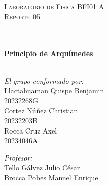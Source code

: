 \documentclass[10pt]{article}
\begin{document}
\begin{center}
\begin{minipage}{0.9\textwidth} 
\begin{center}																					%
\textsc{\LARGE  Laboratorio de Física BFI01 A\\[0.7cm] Reporte 05}
\end{center}
\end{minipage}\\[0.3cm]
 			\vspace*{0.4cm}																		%
\HRule \\[0.5cm]																	%
{ \huge \bfseries Principio de Arquímedes}\\[0.2cm]	%
\HRule \\[0.9cm]																	%
\begin{minipage}{0.46\textwidth}													%
\begin{flushleft} \large															%

\emph{El grupo conformado por:}\\[2mm]
Llactahuaman Quispe Benjamin\\20232268G \\[1mm]
Cortez Núñez Christian\\20232203B\\[1mm]
Rocca Cruz Axel\\20234046A\\[1mm]
 

\end{flushleft}																		%
\end{minipage}		
\begin{minipage}{0.52\textwidth}		
\vspace{-1.9cm}											%
\begin{flushright} \large															%
\emph{Profesor:}\\[2mm]																	%
Tello Gálvez Julio César\\[1mm]Brocca Pobes Manuel Enrique\\
\end{flushright}																	%
\end{minipage}	
\vspace*{1cm}
 	

\end{center}
\end{document}
